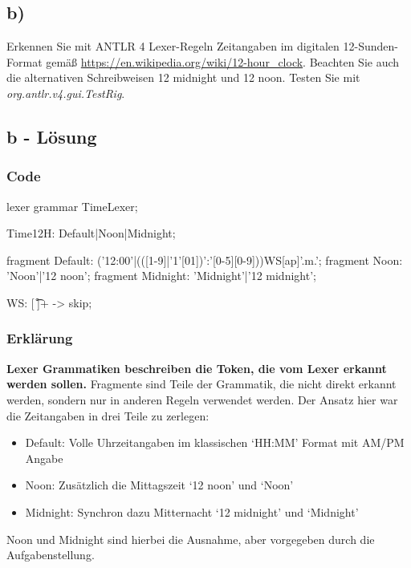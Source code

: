 \newpage

\subsection*{b)}
Erkennen Sie mit ANTLR 4 Lexer-Regeln Zeitangaben im digitalen 12-Sunden-Format gemäß \url{https://en.wikipedia.org/wiki/12-hour_clock}.
Beachten Sie auch die alternativen Schreibweisen 12 midnight und 12 noon. Testen Sie mit \textit{org.antlr.v4.gui.TestRig}.

\subsection*{b - Lösung}

\subsubsection{Code}
\begin{code}[language=antlr, caption={Lexer für Date/Time}, label={lst:Aufgabe1b}]
    lexer grammar TimeLexer;

    Time12H: Default|Noon|Midnight;

    fragment Default: ('12:00'|(([1-9]|'1'[01])':'[0-5][0-9]))WS[ap]'.m.';
    fragment Noon: 'Noon'|'12 noon';
    fragment Midnight: 'Midnight'|'12 midnight';

    WS: [ \t\r\n]+ -> skip;
\end{code}

\subsubsection{Erklärung}
\textbf{Lexer Grammatiken beschreiben die Token, die vom Lexer erkannt werden sollen.}
Fragmente sind Teile der Grammatik, die nicht direkt erkannt werden, sondern nur in anderen Regeln verwendet werden. \newline
Der Ansatz hier war die Zeitangaben in drei Teile zu zerlegen: \newline
\begin{itemize}
    \item Default: Volle Uhrzeitangaben im klassischen `HH:MM' Format mit AM/PM Angabe
    \item Noon: Zusätzlich die Mittagszeit `12 noon' und `Noon'
    \item Midnight: Synchron dazu Mitternacht `12 midnight' und `Midnight'
\end{itemize}
Noon und Midnight sind hierbei die Ausnahme, aber vorgegeben durch die Aufgabenstellung. \newline

